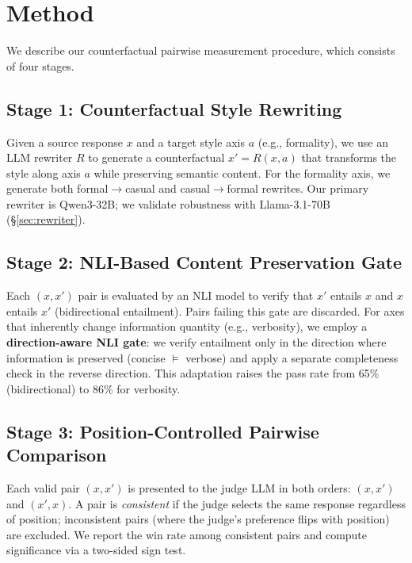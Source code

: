 \documentclass[11pt]{article}
\begin{document}
\section{Method}

We describe our counterfactual pairwise measurement procedure, which consists of four stages.

\subsection{Stage 1: Counterfactual Style Rewriting}
Given a source response $x$ and a target style axis $a$ (e.g., formality), we use an LLM rewriter $R$ to generate a counterfactual $x' = R(x, a)$ that transforms the style along axis $a$ while preserving semantic content.
For the formality axis, we generate both formal$\to$casual and casual$\to$formal rewrites.
Our primary rewriter is Qwen3-32B; we validate robustness with Llama-3.1-70B (\S\ref{sec:rewriter}).

\subsection{Stage 2: NLI-Based Content Preservation Gate}
Each $(x, x')$ pair is evaluated by an NLI model to verify that $x'$ entails $x$ and $x$ entails $x'$ (bidirectional entailment).
Pairs failing this gate are discarded.
For axes that inherently change information quantity (e.g., verbosity), we employ a \textbf{direction-aware NLI gate}: we verify entailment only in the direction where information is preserved (concise $\models$ verbose) and apply a separate completeness check in the reverse direction.
This adaptation raises the pass rate from 65\% (bidirectional) to 86\% for verbosity.

\subsection{Stage 3: Position-Controlled Pairwise Comparison}
Each valid pair $(x, x')$ is presented to the judge LLM in both orders: $(x, x')$ and $(x', x)$.
A pair is \emph{consistent} if the judge selects the same response regardless of position; inconsistent pairs (where the judge's preference flips with position) are excluded.
We report the win rate among consistent pairs and compute significance via a two-sided sign test.
\end{document}
